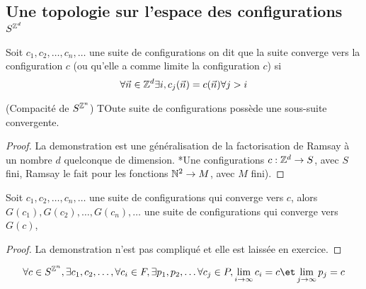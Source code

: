 \subsection{Une topologie sur l'espace des configurations $S^{\mathbb{Z}^d}$}


\begin{definition}
	Soit $c_1,c_2, \ldots, c_n, \ldots$ une suite de configurations on dit que la suite converge vers
	la configuration $c$ (ou qu'elle a comme limite la configuration $c$) si
	$$ \forall \vec n \in \mathbb{Z}^d \exists i, c_j(\vec n) = c(\vec n) \forall j > i$$
\end{definition}

\begin{prop}(Compacité de $S^{\mathbb{Z}^n}$)
	TOute suite de configurations possède une sous-suite convergente.
\end{prop}

\begin{proof}
	La demonstration est une généralisation de la factorisation de Ramsay à un nombre $d$ quelconque de dimension.
	*Une configurations $c : \mathbb{Z}^d \to S$, avec $S$ fini, Ramsay le fait pour les fonctions $\mathbb{N} ^ 2 \to M$, avec $M$ fini).
\end{proof}

\begin{prop} \label{prop:continues}
	Soit $c_1,c_2, \ldots, c_n, \ldots$ une suite de configurations qui converge vers $c$,
	alors $G(c_1),G(c_2), \ldots, G(c_n), \ldots$ une suite de configurations qui converge vers $G(c)$,
\end{prop}

\begin{proof}
	La demonstration n'est pas compliqué et elle est laissée en exercice.
\end{proof}

\begin{prop}\label{prop:dense}
	$$\forall c \in S^{\Z^n}, \exists c_1,c_2, \ldots,\forall c_i \in F, \exists p_1,p_2, \ldots \forall c_j \in P, \lim_{i \to \infty} c_i = c \et \lim_{j \to \infty} p_j = c $$
\end{prop}

